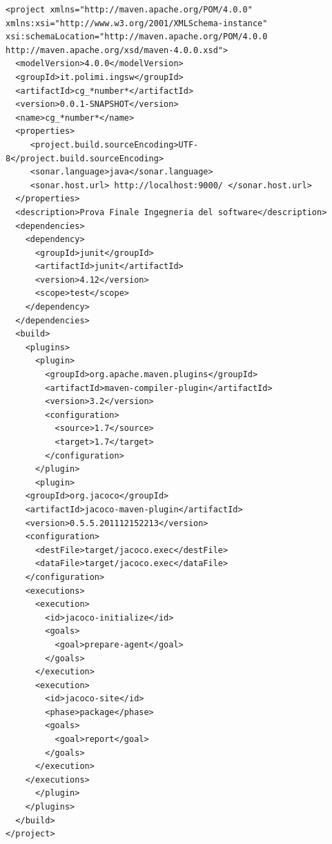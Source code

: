\documentclass{article}
\begin{document}
\begin{lstlisting}
<project xmlns="http://maven.apache.org/POM/4.0.0" xmlns:xsi="http://www.w3.org/2001/XMLSchema-instance" xsi:schemaLocation="http://maven.apache.org/POM/4.0.0 http://maven.apache.org/xsd/maven-4.0.0.xsd">
  <modelVersion>4.0.0</modelVersion>
  <groupId>it.polimi.ingsw</groupId> 
  <artifactId>cg_*number*</artifactId> 
  <version>0.0.1-SNAPSHOT</version>
  <name>cg_*number*</name>
  <properties>
     <project.build.sourceEncoding>UTF-8</project.build.sourceEncoding>
     <sonar.language>java</sonar.language>
     <sonar.host.url> http://localhost:9000/ </sonar.host.url>
  </properties>
  <description>Prova Finale Ingegneria del software</description>
  <dependencies>
    <dependency>
      <groupId>junit</groupId>
      <artifactId>junit</artifactId>
      <version>4.12</version>
      <scope>test</scope>
    </dependency>
  </dependencies>
  <build>
    <plugins>
      <plugin>
        <groupId>org.apache.maven.plugins</groupId>
        <artifactId>maven-compiler-plugin</artifactId>
        <version>3.2</version>
        <configuration>
          <source>1.7</source>
          <target>1.7</target>
        </configuration>
      </plugin>
      <plugin>
	<groupId>org.jacoco</groupId>
	<artifactId>jacoco-maven-plugin</artifactId>
	<version>0.5.5.201112152213</version>
	<configuration>
	  <destFile>target/jacoco.exec</destFile>
	  <dataFile>target/jacoco.exec</dataFile>
	</configuration>
	<executions>
	  <execution>
	    <id>jacoco-initialize</id>
	    <goals>
	      <goal>prepare-agent</goal>
	    </goals>
	  </execution>
	  <execution>
	    <id>jacoco-site</id>
	    <phase>package</phase>
	    <goals>
	      <goal>report</goal>
	    </goals>
	  </execution>
	</executions>
      </plugin>
    </plugins>
  </build>
</project>
\end{lstlisting}
\end{document}
